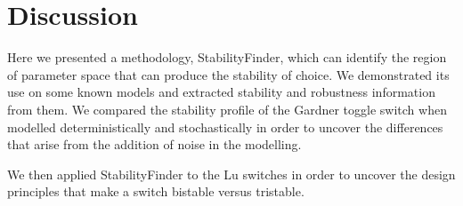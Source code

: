 \section{Discussion}

Here we presented a methodology, StabilityFinder, which can identify the region of parameter space that can produce the stability of choice. We demonstrated its use on some known models and extracted stability and robustness information from them. We compared the stability profile of the Gardner toggle switch when modelled deterministically and stochastically in order to uncover the differences that arise from the addition of noise in the modelling.%

We then applied StabilityFinder to the Lu switches in order to uncover the design principles that make a switch bistable versus tristable. %


